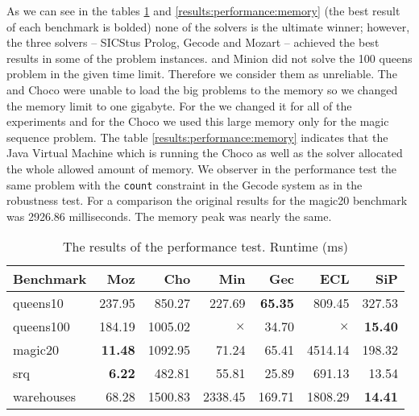 As we can see in the tables \ref{results:performance:runtime} and \ref{results:performance:memory} (the best result of each benchmark is bolded) none 
of the solvers is the ultimate winner; however, the three solvers -- SICStus Prolog, Gecode and 
Mozart -- achieved the best results in some of the problem instances. \eclipse and
Minion did not solve the 100 queens problem in the given time limit. Therefore we 
consider them as unreliable. The \eclipse and Choco were unable to load the big problems
to the memory so we changed the memory limit to one gigabyte. For the \eclipse we changed it for all of the
experiments and for the Choco we used this large memory only for the magic sequence problem.
The table \ref{results:performance:memory} indicates that the Java Virtual Machine which
is running the Choco as well as the \eclipse solver allocated the whole allowed
amount of memory. We observer in the performance test the same problem with the \texttt{count}
constraint in the Gecode system as in the robustness test. For a comparison the original
results for the magic20 benchmark was 2926.86 milliseconds. The memory peak was nearly the same.

\begin{table}
\caption{\label{results:performance:runtime}The results of the performance test. Runtime (ms)}
\begin{center}
\begin{tabular}{lrrrrrr}
\hline Benchmark & Moz & Cho & Min & Gec & ECL & SiP \\
\hline queens10 & 237.95 & 850.27 & 227.69 & {\bf 65.35} & 809.45 & 327.53 \\
	queens100 & 184.19 & 1005.02 & $\times$ & 34.70 & $\times$ & {\bf 15.40} \\
	magic20 & {\bf 11.48} & 1092.95 & 71.24 & 65.41 & 4514.14 & 198.32 \\
	srq & {\bf 6.22} & 482.81 & 55.81 & 25.89 & 691.13 & 13.54 \\
	warehouses & 68.28 & 1500.83 & 2338.45 & 169.71 & 1808.29 & {\bf 14.41} \\  
\hline 
\end{tabular}
\end{center}
\end{table}

